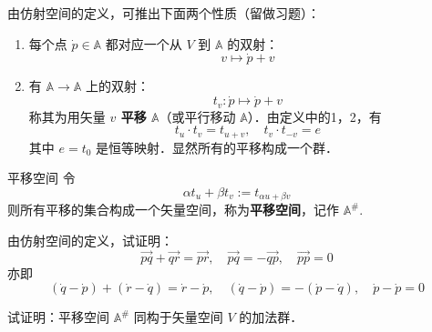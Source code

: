 由仿射空间的定义，可推出下面两个性质（留做习题）：
\begin{enumerate}
\item 每个点 $\dot p\in \mathbb A$ 都对应一个从 $V$ 到 $\mathbb A$ 的双射：
\begin{equation}
v\mapsto \dot p+v
\end{equation}

\item 有 $\mathbb A\rightarrow\mathbb A$ 上的双射：
\begin{equation}\label{AfSp_eq3}
t_v:\dot p\mapsto\dot p+v
\end{equation}
 称其为用矢量 \textbf{$v$ 平移 $\mathbb A$}（或平行移动 $\mathbb A$）．由定义中的1，2，有
 \begin{equation}
 t_u\cdot t_v=t_{u+v},\quad t_v\cdot t_{-v}=e
 \end{equation}
  其中 $e=t_0$ 是恒等映射．显然所有的平移构成一个群．
\end{enumerate}
\begin{definition}{平移空间}
令
\begin{equation}
\alpha t_u+\beta t_v:= t_{\alpha u+\beta v}
\end{equation}
则所有平移的集合构成一个矢量空间，称为\textbf{平移空间}，记作 $\mathbb A^{\#}$.
\end{definition}
\begin{example}{}
由仿射空间的定义，试证明：
\begin{equation}\label{AfSp_eq1}
\overrightarrow{pq}+\overrightarrow{qr}=\overrightarrow{pr},\quad \overrightarrow{pq}=-\overrightarrow{qp},\quad\overrightarrow{pp}=0
\end{equation}
亦即
\begin{equation}
(\dot q-\dot p )+(\dot r-\dot q)=\dot r-\dot p,\quad(\dot q-\dot p)=-(\dot p-\dot q),\quad\dot p-\dot p=0
\end{equation}
\end{example}
\begin{exercise}{}\label{AfSp_exe1}
试证明：平移空间 $\mathbb A^{\#}$ 同构于矢量空间 $V$ 的加法群．
\end{exercise}
